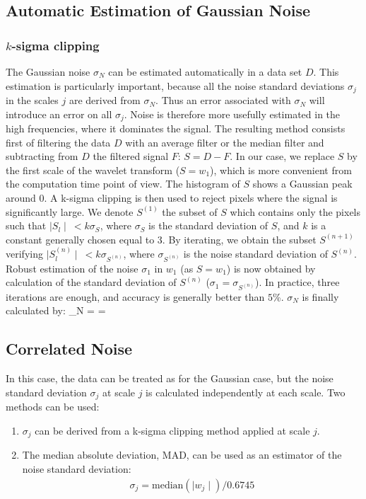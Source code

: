 \subsection{Automatic Estimation of Gaussian Noise}
\subsubsection{$k$-sigma clipping}
The Gaussian noise $\sigma_N$ can be estimated automatically in a data set $D$. This estimation is particularly important, 
because all the noise standard deviations $\sigma_j$ in the scales $j$ are derived from $\sigma_N$. Thus an error associated 
with $\sigma_N$ will introduce an error on all $\sigma_j$. Noise is therefore more usefully estimated in the high frequencies, 
where it dominates the signal. The resulting method consists first of filtering the data $D$ with an average filter or the 
median filter and subtracting from $D$ the filtered signal $F$: $S = D - F $. In our case, we replace $S$ by the first scale 
of the wavelet transform ($S = w_1$), which is more convenient from the computation time point of view. The histogram of $S$ 
shows a Gaussian peak around 0. A k-sigma clipping is then used to reject pixels where the signal is significantly large. 
We denote $S^{(1)}$ the subset of $S$ which contains only the pixels such that $\mid S_l \mid \ < k \sigma_S$, where $\sigma_S$ 
is the standard deviation of $S$, and $k$ is a constant generally chosen equal to 3. By iterating, we obtain the subset $S^{(n+1)}$ 
verifying $\mid S^{(n)}_l \mid \ < k \sigma_{S^{(n)}}$, where $\sigma_{S^{(n)}}$ is the noise standard deviation of $S^{(n)}$. 
Robust estimation of the noise $\sigma_1$ in $w_1$ (as $S = w_1$) is now obtained by calculation of the standard deviation of 
$S^{(n)}$ ($\sigma_1 = \sigma_{S^{(n)}}$). In practice, three iterations are enough, and accuracy is generally better than $5$\%.
$\sigma_N$ is finally calculated by: 
\be
\sigma_N =  = 
\ee


\subsection{Correlated Noise}
In this case, the data can be treated as for the Gaussian case, but the noise standard deviation $\sigma_j$ at scale $j$ 
is calculated independently at each scale. Two methods can be used: 
\begin{enumerate}
\item $\sigma_j$ can be derived from a k-sigma clipping method applied at scale $j$.
\item The median absolute deviation, MAD, can be used as an estimator of the noise standard deviation:
\begin{eqnarray}
\sigma_j = \mbox{median}( \mid w_j \mid ) / 0.6745
\end{eqnarray}
\end{enumerate}


